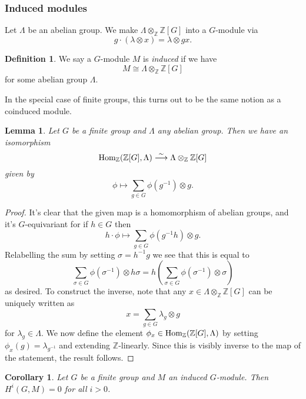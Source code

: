 \documentclass[11pt]{amsart}
\numberwithin{equation}{section}
\newtheorem{lemma}[equation]{Lemma}
\newtheorem{cor}[equation]{Corollary}
\theoremstyle{remark}
\theoremstyle{remark}
\theoremstyle{remark}
\theoremstyle{definition}
\theoremstyle{definition}
\theoremstyle{definition}
\newtheorem{defi}[equation]{Definition}
\theoremstyle{definition}
\theoremstyle{definition}
\theoremstyle{definition}
\begin{document}
\subsubsection{Induced modules}

Let $\Lambda$ be an abelian group. We make $\Lambda \otimes_\mathbb{Z} \mathbb{Z}[G]$ into a $G$-module via
\[g\cdot (\lambda \otimes x)=\lambda \otimes gx.\]

\begin{defi}
We say a $G$-module $M$ is \textit{induced} if we have 
\[M\cong \Lambda \otimes_\mathbb{Z} \mathbb{Z}[G]\]
for some abelian group $\Lambda$. 
\end{defi}

In the special case of finite groups, this turns out to be the same notion as a coinduced module. 

\begin{lemma} \label{induced and coinduced coincide}
Let $G$ be a finite group and $\Lambda$ any abelian group. Then we have an isomorphism \[\textup{Hom}_{\mathbb{Z}}(\mathbb{Z}[G],\Lambda) \stackrel{\sim}{\longrightarrow} \Lambda \otimes_\mathbb{Z} \mathbb{Z}[G]\]
given by 
\[\phi \longmapsto \sum_{g\in G}\phi\left(g^{-1}\right)\otimes g.\]
\end{lemma}

\begin{proof}
It's clear that the given map is a homomorphism of abelian groups, and it's $G$-equivariant for if $h\in G$ then 
\[h\cdot \phi \longmapsto \sum_{g\in G}\phi\left(g^{-1}h\right)\otimes g.\]
Relabelling the sum by setting $\sigma = h^{-1}g$ we see that this is equal to 
\[\sum_{\sigma \in G} \phi \left(\sigma^{-1}\right)\otimes h\sigma = h \left(\sum_{\sigma \in G} \phi \left(\sigma^{-1}\right)\otimes \sigma \right)\]
as desired. To construct the inverse, note that any $x\in \Lambda \otimes_\mathbb{Z} \mathbb{Z}[G]$ can be uniquely written as
\[x=\sum_{g\in G}\lambda_g \otimes g\]
for  $\lambda_g\in \Lambda$. We now define the element $\phi_x\in   \textup{Hom}_{\mathbb{Z}}(\mathbb{Z}[G],\Lambda)$ by setting 
$\phi_x(g)=\lambda_{g^{-1}}$
and extending $\mathbb{Z}$-linearly. Since this is visibly inverse to the map of the statement, the result follows.
\end{proof}

\begin{cor} \label{induction is zero}
Let $G$ be a finite group and $M$ an induced $G$-module. Then $H^i(G,M)=0$
for all $i>0$.
\end{cor}
\end{document}
